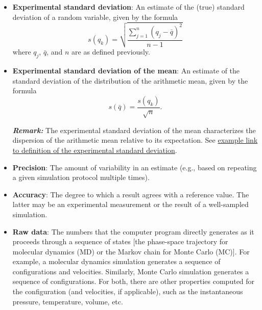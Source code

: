 \begin{itemize}
\item {\bf Experimental standard deviation}: An estimate of the (true) standard deviation of a random variable, given by the formula
  \begin{equation}
    s\left(q_k\right) = \sqrt{\dfrac{\sum_{j=1}^n\left(q_j - \bar{q}\right)^2}{n-1}} \label{def:exp_st_dev}
  \end{equation}
  where $q_j$, $\bar{q}$, and $n$ are as defined previously. 
  
\item {\bf Experimental standard deviation of the mean}: An estimate of the standard deviation of the distribution of the arithmetic mean, given by the formula
  \begin{equation}
    s\left(\bar{q}\right) = \dfrac{s\left(q_k\right)}{\sqrt{n}}. \label{def:exp_st_dev_mean}
  \end{equation}
  \smallskip
  
\textbf{\textit{Remark:}} The experimental standard deviation of the mean characterizes the dispersion of the arithmetic mean relative to its expectation.
See \hyperref[def:exp_st_dev]{example link to definition of the experimental standard deviation}.
  
\item {\bf Precision}: The amount of variability in an estimate (e.g., based on repeating a given simulation protocol multiple times).  %
  
  
\item {\bf Accuracy}: The degree to which a result agrees with a reference value.
The latter may be an experimental measurement or the result of a well-sampled simulation.  
  
\item {\bf Raw data}: The numbers that the computer program directly generates as it proceeds through a sequence of states [the phase-space trajectory for molecular dynamics (MD) or the Markov chain for Monte Carlo (MC)].
For example, a molecular dynamics simulation generates a sequence of configurations and velocities.
Similarly, Monte Carlo simulation generates a sequence of configurations.
For both, there are other properties computed for the configuration (and velocities, if applicable), such as the instantaneous pressure, temperature, volume, etc.
  

\end{itemize}
